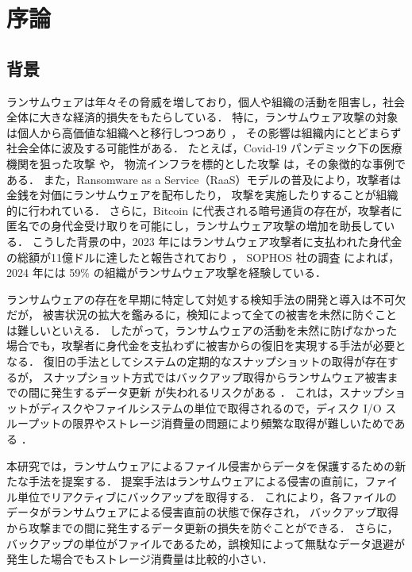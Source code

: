 \chapter{序論}
\section{背景}
ランサムウェアは年々その脅威を増しており，個人や組織の活動を阻害し，社会全体に大きな経済的損失をもたらしている．
特に，ランサムウェア攻撃の対象は個人から高価値な組織へと移行しつつあり \cite{sophos-report:online,early-detection}，
その影響は組織内にとどまらず社会全体に波及する可能性がある．
たとえば，Covid-19 パンデミック下の医療機関を狙った攻撃 \cite{Covid19R19:online} や，
物流インフラを標的とした攻撃 \cite{nagoya-port-attack} は，その象徴的な事例である．
また，Ransomware as a Service（RaaS）モデルの普及により，攻撃者は金銭を対価にランサムウェアを配布したり，
攻撃を実施したりすることが組織的に行われている．
さらに，Bitcoin に代表される暗号通貨の存在が，攻撃者に匿名での身代金受け取りを可能にし，ランサムウェア攻撃の増加を助長している．
こうした背景の中，2023 年にはランサムウェア攻撃者に支払われた身代金の総額が11億ドルに達したと報告されており \cite{Ransomwa86:online}，
SOPHOS 社の調査 \cite{sophos-report:online} によれば，2024 年には 59\% の組織がランサムウェア攻撃を経験している．

ランサムウェアの存在を早期に特定して対処する検知手法の開発と導入は不可欠だが，
被害状況の拡大を鑑みるに，検知によって全ての被害を未然に防ぐことは難しいといえる．
したがって，ランサムウェアの活動を未然に防げなかった場合でも，攻撃者に身代金を支払わずに被害からの復旧を実現する手法が必要となる．
復旧の手法としてシステムの定期的なスナップショットの取得が存在するが，
スナップショット方式ではバックアップ取得からランサムウェア被害までの間に発生するデータ更新
が失われるリスクがある \cite{wang2024ransom}．
これは，スナップショットがディスクやファイルシステムの単位で取得されるので，ディスク I/O スループットの限界やストレージ消費量の問題により頻繁な取得が難しいためである
\cite{wang2024ransom, veena2021incremental}．

本研究では，ランサムウェアによるファイル侵害からデータを保護するための新たな手法を提案する．
提案手法はランサムウェアによる侵害の直前に，ファイル単位でリアクティブにバックアップを取得する．
これにより，各ファイルのデータがランサムウェアによる侵害直前の状態で保存され，
バックアップ取得から攻撃までの間に発生するデータ更新の損失を防ぐことができる．
さらに，バックアップの単位がファイルであるため，誤検知によって無駄なデータ退避が発生した場合でもストレージ消費量は比較的小さい．
